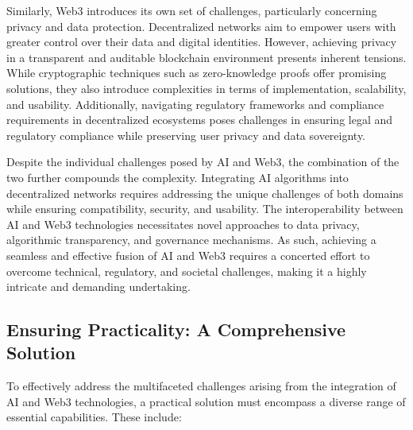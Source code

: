 \documentclass[conference]{IEEEtran}
\begin{document}
Similarly, Web3 introduces its own set of challenges, particularly concerning privacy and data protection. Decentralized networks aim to empower users with greater control over their data and digital identities. However, achieving privacy in a transparent and auditable blockchain environment presents inherent tensions. While cryptographic techniques such as zero-knowledge proofs offer promising solutions, they also introduce complexities in terms of implementation, scalability, and usability. Additionally, navigating regulatory frameworks and compliance requirements in decentralized ecosystems poses challenges in ensuring legal and regulatory compliance while preserving user privacy and data sovereignty.

Despite the individual challenges posed by AI and Web3, the combination of the two further compounds the complexity. Integrating AI algorithms into decentralized networks requires addressing the unique challenges of both domains while ensuring compatibility, security, and usability. The interoperability between AI and Web3 technologies necessitates novel approaches to data privacy, algorithmic transparency, and governance mechanisms. As such, achieving a seamless and effective fusion of AI and Web3 requires a concerted effort to overcome technical, regulatory, and societal challenges, making it a highly intricate and demanding undertaking.

\subsection{Ensuring Practicality: A Comprehensive Solution}

To effectively address the multifaceted challenges arising from the integration of AI and Web3 technologies, a practical solution must encompass a diverse range of essential capabilities. These include:
\end{document}
